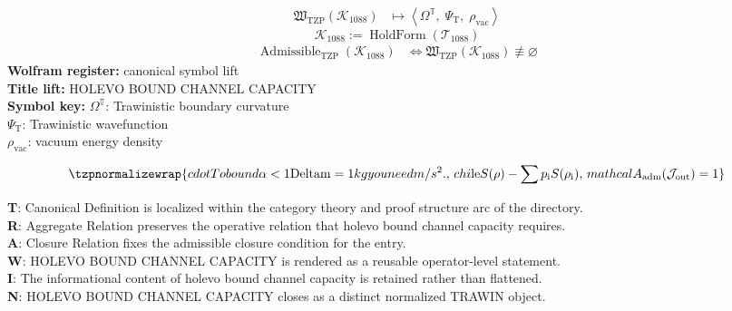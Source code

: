 \noindent
\begin{minipage}[t]{0.48\linewidth}
\begingroup
\small
\[
\begin{aligned}
\mathfrak{W}_{\mathrm{TZP}}\!\left(\mathcal{K}_{1088}\right)
&\longmapsto
\left\langle \Omega^{\mathbb{T}},\; \Psi_{\mathrm{T}},\; \rho_{\mathrm{vac}} \right\rangle
\end{aligned}
\]
\[
\mathcal{K}_{1088}
:=
\operatorname{HoldForm}\!\left(\mathcal{T}_{1088}\right)
\]
\[
\begin{aligned}
\operatorname{Admissible}_{\mathrm{TZP}}\!\left(\mathcal{K}_{1088}\right)
&\Longleftrightarrow
\mathfrak{W}_{\mathrm{TZP}}\!\left(\mathcal{K}_{1088}\right)\not\equiv\varnothing
\end{aligned}
\]
\textbf{Wolfram register:} canonical symbol lift\\
\textbf{Title lift:} HOLEVO BOUND CHANNEL CAPACITY\\
\textbf{Symbol key:} \(\Omega^{\mathbb{T}}\): Trawinistic boundary curvature\\ \(\Psi_{\mathrm{T}}\): Trawinistic wavefunction\\ \(\rho_{\mathrm{vac}}\): vacuum energy density
\par
\endgroup
\end{minipage}\hfill
\begin{minipage}[t]{0.48\linewidth}
\[
\tzpnormalizewrap{cdot To bound \alpha < 1 \mathrm{Deltam} = 1 kg you need m/s^{2}.,\,chi \mathrm{le} S(\rho) - \sum p_{\mathrm{i}} S(\rho_{\mathrm{i}}),\,mathcal{A}_{\mathrm{adm}}\!\left(\mathcal{J}_{\mathrm{out}}\right)=1}
\]

\small
\textbf{T}: Canonical Definition is localized within the category theory and proof structure arc of the directory.\\
\textbf{R}: Aggregate Relation preserves the operative relation that holevo bound channel capacity requires.\\
\textbf{A}: Closure Relation fixes the admissible closure condition for the entry.\\
\textbf{W}: HOLEVO BOUND CHANNEL CAPACITY is rendered as a reusable operator-level statement.\\
\textbf{I}: The informational content of holevo bound channel capacity is retained rather than flattened.\\
\textbf{N}: HOLEVO BOUND CHANNEL CAPACITY closes as a distinct normalized TRAWIN object.
\normalsize
\end{minipage}


